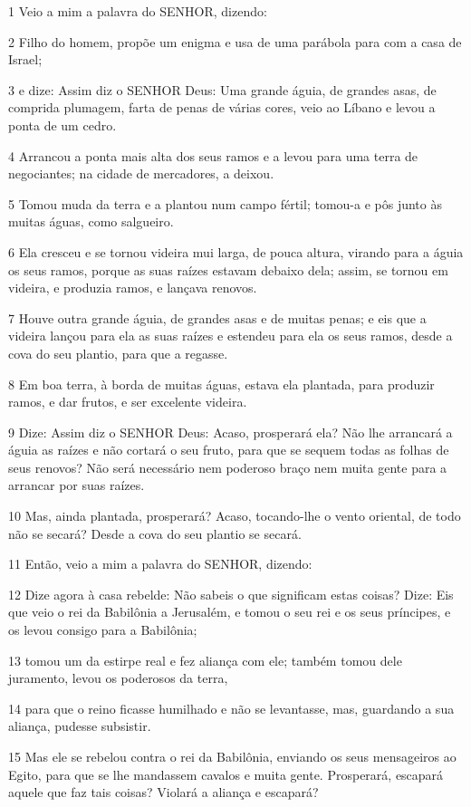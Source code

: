 \par 1 Veio a mim a palavra do SENHOR, dizendo:
\par 2 Filho do homem, propõe um enigma e usa de uma parábola para com a casa de Israel;
\par 3 e dize: Assim diz o SENHOR Deus: Uma grande águia, de grandes asas, de comprida plumagem, farta de penas de várias cores, veio ao Líbano e levou a ponta de um cedro.
\par 4 Arrancou a ponta mais alta dos seus ramos e a levou para uma terra de negociantes; na cidade de mercadores, a deixou.
\par 5 Tomou muda da terra e a plantou num campo fértil; tomou-a e pôs junto às muitas águas, como salgueiro.
\par 6 Ela cresceu e se tornou videira mui larga, de pouca altura, virando para a águia os seus ramos, porque as suas raízes estavam debaixo dela; assim, se tornou em videira, e produzia ramos, e lançava renovos.
\par 7 Houve outra grande águia, de grandes asas e de muitas penas; e eis que a videira lançou para ela as suas raízes e estendeu para ela os seus ramos, desde a cova do seu plantio, para que a regasse.
\par 8 Em boa terra, à borda de muitas águas, estava ela plantada, para produzir ramos, e dar frutos, e ser excelente videira.
\par 9 Dize: Assim diz o SENHOR Deus: Acaso, prosperará ela? Não lhe arrancará a águia as raízes e não cortará o seu fruto, para que se sequem todas as folhas de seus renovos? Não será necessário nem poderoso braço nem muita gente para a arrancar por suas raízes.
\par 10 Mas, ainda plantada, prosperará? Acaso, tocando-lhe o vento oriental, de todo não se secará? Desde a cova do seu plantio se secará.
\par 11 Então, veio a mim a palavra do SENHOR, dizendo:
\par 12 Dize agora à casa rebelde: Não sabeis o que significam estas coisas? Dize: Eis que veio o rei da Babilônia a Jerusalém, e tomou o seu rei e os seus príncipes, e os levou consigo para a Babilônia;
\par 13 tomou um da estirpe real e fez aliança com ele; também tomou dele juramento, levou os poderosos da terra,
\par 14 para que o reino ficasse humilhado e não se levantasse, mas, guardando a sua aliança, pudesse subsistir.
\par 15 Mas ele se rebelou contra o rei da Babilônia, enviando os seus mensageiros ao Egito, para que se lhe mandassem cavalos e muita gente. Prosperará, escapará aquele que faz tais coisas? Violará a aliança e escapará?
